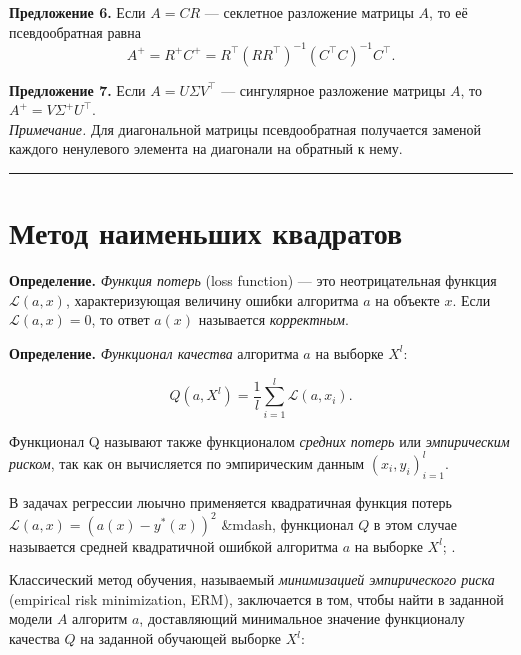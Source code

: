 \documentclass[11pt,a4paper]{article}
\renewcommand{\linethickness}{0.1ex}
\begin{document}
\textbf{Предложение 6.} Если \(A = CR\) --- секлетное разложение матрицы
\(A\), то её псевдообратная равна \[
  A^+ = R^+ C^+ = R^\top (R R^\top)^{-1} (C^\top C)^{-1} C^\top.
\]

\textbf{Предложение 7.} Если \(A = U \Sigma V^\top\) --- сингулярное
разложение матрицы \(A\), то \(A^+ = V \Sigma^+ U^\top\).\\
\emph{Примечание.} Для диагональной матрицы псевдообратная получается
заменой каждого ненулевого элемента на диагонали на обратный к нему.

    \begin{center}\rule{0.5\linewidth}{\linethickness}\end{center}

    \hypertarget{ux43cux435ux442ux43eux434-ux43dux430ux438ux43cux435ux43dux44cux448ux438ux445-ux43aux432ux430ux434ux440ux430ux442ux43eux432}{%
\section{Метод наименьших
квадратов}\label{ux43cux435ux442ux43eux434-ux43dux430ux438ux43cux435ux43dux44cux448ux438ux445-ux43aux432ux430ux434ux440ux430ux442ux43eux432}}

\textbf{Определение.} \emph{Функция потерь} (loss function) --- это
неотрицательная функция \(\mathcal{L}(a, x)\), характеризующая величину
ошибки алгоритма \(a\) на объекте \(x\). Если \(\mathcal{L}(a, x) = 0\),
то ответ \(a(x)\) называется \emph{корректным}.

\textbf{Определение.} \emph{Функционал качества} алгоритма \(a\) на
выборке \(X^l\):

\[ Q(a,X^l) = \frac{1}{l} \sum_{i=1}^{l} \mathcal{L}(a, x_i). \]

Функционал Q называют также функционалом \emph{средних потерь} или
\emph{эмпирическим риском}, так как он вычисляется по эмпирическим
данным \((x_i, y_i)_{i=1}^l\).

В задачах регрессии люычно применяется квадратичная функция потерь
\(\mathcal{L}(a, x) = (a(x) − y^*(x))^2\) \&mdash, функционал \(Q\) в
этом случае называется средней квадратичной ошибкой алгоритма \(a\) на
выборке \(X^l\); .

Классический метод обучения, называемый \emph{минимизацией эмпирического
риска} (empirical risk minimization, ERM), заключается в том, чтобы
найти в заданной модели \(A\) алгоритм \(a\), доставляющий минимальное
значение функционалу качества \(Q\) на заданной обучающей выборке
\(X^l\):
\end{document}
